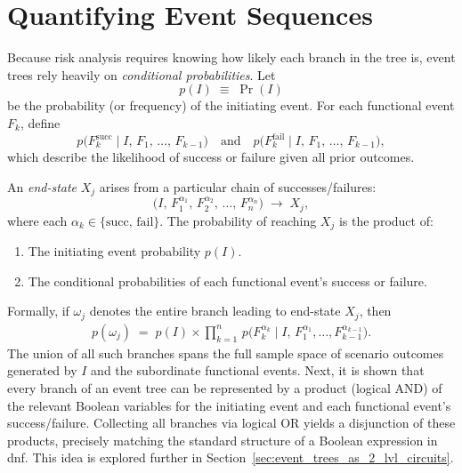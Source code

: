 \section{Quantifying Event Sequences}

Because risk analysis requires knowing how likely each branch in the tree is, event trees rely heavily on \emph{conditional probabilities}. Let
\[
    p(I)
    \;\equiv\;
    \Pr(I)
\]
be the probability (or frequency) of the initiating event. For each functional event \(F_k\), define
\[
    p\bigl(F_k^{\text{succ}}\mid I,\, F_1,\,\dots,\,F_{k-1}\bigr)
    \quad\text{and}\quad
    p\bigl(F_k^{\text{fail}}\mid I,\, F_1,\,\dots,\,F_{k-1}\bigr),
\]
which describe the likelihood of success or failure given all prior outcomes.

An \emph{end-state} \(X_j\) arises from a particular chain of successes/failures:
\[
    \bigl(I,\,F_1^{\alpha_1},\,F_2^{\alpha_2},\,\ldots,\,F_n^{\alpha_n}\bigr)
    \;\longrightarrow\; 
    X_j,
\]
where each \(\alpha_k \in \{\text{succ},\,\text{fail}\}\). The probability of reaching \(X_j\) is the product of:
\begin{enumerate}
    \item The initiating event probability \(p(I)\).
    \item The conditional probabilities of each functional event's success or failure.
\end{enumerate}
Formally, if \(\omega_j\) denotes the entire branch leading to end-state \(X_j\), then
\begin{align}
\label{eq:event_tree_branch_probability}
    p(\omega_j)
    \;=\;
    p(I)
    \times
    \prod_{k=1}^{n}\,
    p\!\bigl(F_k^{\alpha_k}\mid 
             I,\,
             F_1^{\alpha_1},\ldots,
             F_{k-1}^{\alpha_{k-1}}\bigr).
\end{align}
The union of all such branches spans the full sample space of scenario outcomes generated by \(I\) and the subordinate functional events. Next, it is shown that every branch of an event tree can be represented by a product (logical AND) of the relevant Boolean variables for the initiating event and each functional event’s success/failure. Collecting all branches via logical OR yields a disjunction of these products, precisely matching the standard structure of a Boolean expression in \acrfull{dnf}. This idea is explored further in Section~\ref{sec:event_trees_as_2_lvl_circuits}.